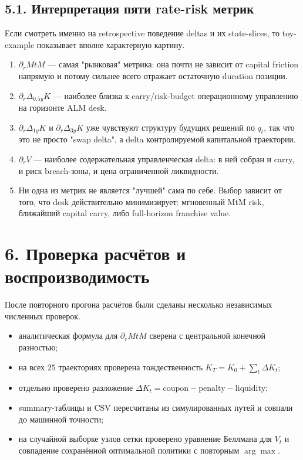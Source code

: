 \documentclass[11pt,a4paper]{article}
\begin{document}
\subsection*{5.1. Интерпретация пяти rate-risk метрик}
Если смотреть именно на retrospective поведение deltas и их state-slices, то toy-example показывает вполне характерную картину.
\begin{enumerate}[label=\arabic*)]
  \item \textbf{$\partial_r MtM$} --- самая "рынковая" метрика: она почти не зависит от capital friction напрямую и потому сильнее всего отражает остаточную duration позиции.
  \item \textbf{$\partial_r \Delta_{0.5y}K$} --- наиболее близка к carry/risk-budget операционному управлению на горизонте ALM desk.
  \item \textbf{$\partial_r \Delta_{1y}K$} и \textbf{$\partial_r \Delta_{3y}K$} уже чувствуют структуру будущих решений по $q_t$, так что это не просто "swap delta", а delta контролируемой капитальной траектории.
  \item \textbf{$\partial_r V$} --- наиболее содержательная управленческая delta: в ней собран и carry, и риск breach-зоны, и цена ограниченной ликвидности.
  \item Ни одна из метрик не является "лучшей" сама по себе. Выбор зависит от того, что desk действительно минимизирует: мгновенный MtM risk, ближайший capital carry, либо full-horizon franchise value.
\end{enumerate}


\section*{6. Проверка расчётов и воспроизводимость}
После повторного прогона расчётов были сделаны несколько независимых численных проверок.
\begin{itemize}
  \item аналитическая формула для $\partial_r MtM$ сверена с центральной конечной разностью;
  \item на всех $25$ траекториях проверена тождественность $K_T = K_0 + \sum_t \Delta K_t$;
  \item отдельно проверено разложение $\Delta K_t = \text{coupon} - \text{penalty} - \text{liquidity}$;
  \item summary-таблицы и CSV пересчитаны из симулированных путей и совпали до машинной точности;
  \item на случайной выборке узлов сетки проверено уравнение Беллмана для $V_t$ и совпадение сохранённой оптимальной политики с повторным $\arg\max$.
\end{itemize}
\end{document}
